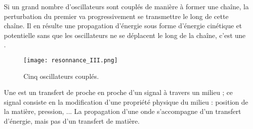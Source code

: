 Si un grand nombre d'oscillateurs sont couplés de manière à former une chaîne, la perturbation du premier va progressivement se transmettre le long de cette chaîne. Il en résulte une propagation d'énergie sous forme d'énergie cinétique et potentielle sans que les oscillateurs ne se déplacent le long de la chaîne, c'est une .

\begin{figure}[ht!]
    \centering
    \texttt{[image: resonnance\_III.png]}
    \caption{Cinq oscillateurs couplés.}
    \label{resonnanceIII}
\end{figure}


\begin{encadre}
    Une  est un transfert de proche en proche d'un signal à travers un milieu ; ce signal consiste en la modification d'une propriété physique du milieu : position de la matière, pression, ...
    La propagation d'une onde s'accompagne d'un transfert d'énergie, mais pas d'un transfert de matière.
\end{encadre}
